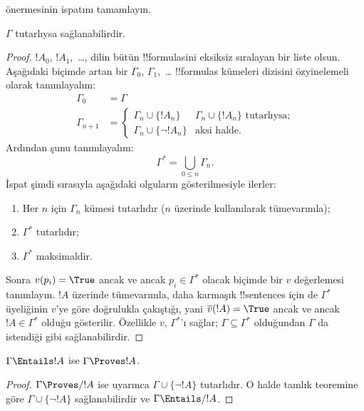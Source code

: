 \begin{prob}
   önermesinin ispatını tamamlayın.
\end{prob}

\begin{thm}[Tamlık]
$\Gamma$ tutarlıysa sağlanabilirdir.
\end{thm}

\begin{proof}
$!A_0$, $!A_1$,~\dots, dilin bütün !!{formula}s{}ini eksiksiz sıralayan bir
liste olsun. Aşağıdaki biçimde artan bir $\Gamma_0$, $\Gamma_1$,~\dots
!!{formula}s kümeleri dizisini özyinelemeli olarak tanımlayalım:
\begin{align*}
\Gamma_0 & = \Gamma\\
\Gamma_{n+1} &  =
\begin{cases}
  \Gamma_n \cup \{!A_n\} & \text{$\Gamma_n \cup \{!A_n\}$ tutarlıysa;}\\
  \Gamma_n \cup \{\lnot !A_n\} & \text{aksi halde}.
\end{cases}
\end{align*}
Ardından şunu tanımlayalım:
\[
\Gamma^* = \bigcup_{0\le n}\Gamma_n.
\]
İspat şimdi sırasıyla aşağıdaki olguların gösterilmesiyle ilerler:
\begin{enumerate}
\item Her $n$ için $\Gamma_n$ kümesi tutarlıdır ($n$ üzerinde
   kullanılarak tümevarımla);
\item $\Gamma^*$ tutarlıdır;
\item $\Gamma^*$ maksimaldir.
\end{enumerate}
Sonra $v(p_i) = \True$ ancak ve ancak $p_i \in \Gamma^*$ olacak biçimde bir
$v$ değerlemesi tanımlayın. $!A$ üzerinde tümevarımla, daha karmaşık
!!{sentence}s için de $\Gamma^*$ üyeliğinin $v$'ye göre doğrulukla çakıştığı,
yani $\overline{v}(!A) = \True$ ancak ve ancak $!A \in \Gamma^*$ olduğu
gösterilir. Özellikle $v$, $\Gamma^*$'ı sağlar; $\Gamma \subseteq \Gamma^*$
olduğundan $\Gamma$ da istendiği gibi sağlanabilirdir.
\end{proof}

\begin{cor}
$\Gamma \Entails !A$ ise $\Gamma \Proves !A$.
\end{cor}

\begin{proof}
$\Gamma\Proves/ !A$ ise  uyarınca
$\Gamma \cup \{\lnot !A\}$ tutarlıdır. O halde tamlık teoremine göre
$\Gamma \cup \{\lnot !A\}$ sağlanabilirdir ve $\Gamma \Entails/ !A$.
\end{proof}

